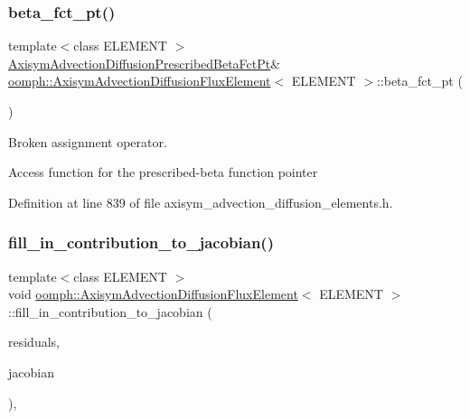 \subsubsection{\texorpdfstring{beta\+\_\+fct\+\_\+pt()}{beta\_fct\_pt()}}
{\footnotesize\ttfamily template$<$class E\+L\+E\+M\+E\+NT $>$ \\
\hyperlink{classoomph_1_1AxisymAdvectionDiffusionFluxElement_ad4453706dae676758946691686e1a1c3}{Axisym\+Advection\+Diffusion\+Prescribed\+Beta\+Fct\+Pt}\& \hyperlink{classoomph_1_1AxisymAdvectionDiffusionFluxElement}{oomph\+::\+Axisym\+Advection\+Diffusion\+Flux\+Element}$<$ E\+L\+E\+M\+E\+NT $>$\+::beta\+\_\+fct\+\_\+pt (\begin{DoxyParamCaption}{ }\end{DoxyParamCaption})\hspace{0.3cm}{\ttfamily [inline]}}



Broken assignment operator. 

Access function for the prescribed-\/beta function pointer 

Definition at line 839 of file axisym\+\_\+advection\+\_\+diffusion\+\_\+elements.\+h.

\mbox{\label{classoomph_1_1AxisymAdvectionDiffusionFluxElement_a6dc7a3bc74b66449b6588d8ea64e7cd7}} 
\subsubsection{\texorpdfstring{fill\+\_\+in\+\_\+contribution\+\_\+to\+\_\+jacobian()}{fill\_in\_contribution\_to\_jacobian()}}
{\footnotesize\ttfamily template$<$class E\+L\+E\+M\+E\+NT $>$ \\
void \hyperlink{classoomph_1_1AxisymAdvectionDiffusionFluxElement}{oomph\+::\+Axisym\+Advection\+Diffusion\+Flux\+Element}$<$ E\+L\+E\+M\+E\+NT $>$\+::fill\+\_\+in\+\_\+contribution\+\_\+to\+\_\+jacobian (\begin{DoxyParamCaption}\item[{\hyperlink{classoomph_1_1Vector}{Vector}$<$ double $>$ \&}]{residuals,  }\item[{\hyperlink{classoomph_1_1DenseMatrix}{Dense\+Matrix}$<$ double $>$ \&}]{jacobian }\end{DoxyParamCaption})\hspace{0.3cm}{\ttfamily [inline]}, {\ttfamily [virtual]}}




